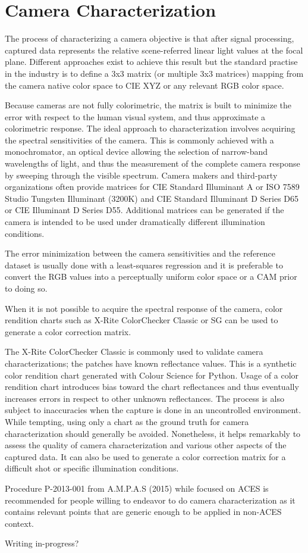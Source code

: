 \section{Camera Characterization}%
\label{sec:camera-characterization}

The process of characterizing a camera objective is that after signal processing, captured data represents the relative scene-referred linear light values at the focal plane. Different approaches exist to achieve this result but the standard practise in the industry is to define a 3x3 matrix (or multiple 3x3 matrices) mapping from the camera native color space to CIE XYZ or any relevant RGB color space.

Because cameras are not fully colorimetric, the matrix is built to minimize the error with respect to the human visual system, and thus approximate a colorimetric response. The ideal approach to characterization involves acquiring the spectral sensitivities of the camera. This is commonly achieved with a monochromator, an optical device allowing the selection of narrow-band wavelengths of light, and thus the measurement of the complete camera response by sweeping through the visible spectrum. Camera makers and third-party organizations often provide matrices for CIE Standard Illuminant A or ISO 7589 Studio Tungsten Illuminant (3200K) and CIE Standard Illuminant D Series D65 or CIE Illuminant D Series D55. Additional matrices can be generated if the camera is intended to be used under dramatically different illumination conditions.

The error minimization between the camera sensitivities and the reference dataset is usually done with a least-squares regression and it is preferable to convert the RGB values into a perceptually uniform color space or a CAM prior to doing so.

When it is not possible to acquire the spectral response of the camera, color rendition charts such as X-Rite ColorChecker Classic or SG can be used to generate a color correction matrix.

The X-Rite  ColorChecker Classic is commonly used to validate camera characterizations; the patches have known reflectance values. This is a synthetic color rendition chart generated with Colour Science for Python.
Usage of a color rendition chart introduces bias toward the chart reflectances and thus eventually increases errors in respect to other unknown reflectances. The process is also subject to inaccuracies when the capture is done in an uncontrolled environment. While tempting, using only a chart as the ground truth for camera characterization should generally be avoided. Nonetheless, it helps remarkably to assess the quality of camera characterization and various other aspects of the captured data. It can also be used to generate a color correction matrix for a difficult shot or specific illumination conditions.


Procedure P-2013-001 from A.M.P.A.S (2015) while focused on ACES is recommended for people willing to endeavor to do camera characterization as it contains relevant points that are generic enough to be applied in non-ACES context.


Writing in-progress?

